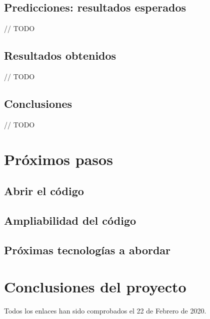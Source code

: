 \documentclass[
  a4paper,  %
  twoside,  %
  bibliography=totoc,
  headsepline,
  cleardoublepage=empty,
  parskip=half,
  draft=false
]{scrbook}
\begin{document}
\section{Predicciones: resultados esperados}
// TODO

\section{Resultados obtenidos}
// TODO

\section{Conclusiones}
// TODO

\chapter{Próximos pasos}
\label{chap:further-steps}

\section{Abrir el código}


\section{Ampliabilidad del código}


\section{Próximas tecnologías a abordar}


\chapter{Conclusiones del proyecto}

\printbibliography

Todos los enlaces han sido comprobados el 22 de Febrero de 2020.

% 

\pagestyle{empty}
\renewcommand*{\chapterpagestyle}{empty}
\end{document}
